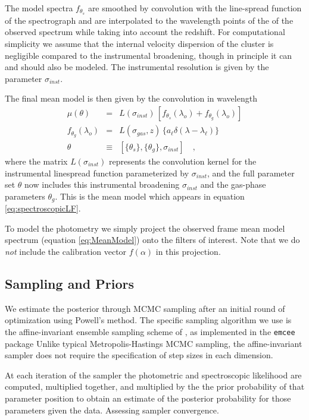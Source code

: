 \documentclass[iop,numberedappendix]{emulateapj}
\begin{document}
The model spectra $f_{\theta_s}$ are smoothed by convolution with
the line-spread function of the spectrograph and are interpolated to
the wavelength points of the of the observed spectrum while taking
into account the redshift. For computational simplicity we assume that
the internal velocity dispersion of the cluster is negligible compared
to the instrumental broadening, though in principle it can and should
also be modeled. The instrumental resolution is given by the parameter
$\sigma_{inst}$. 

The final mean model is then given by the convolution in wavelength
\begin{eqnarray}\label{eq:MeanModel} 
\mu(\theta) &  = & L(\sigma_{inst}) \, \left[ f_{\theta_s}(\lambda_o)
                   + f_{\theta_g}(\lambda_o) \right]\\
f_{\theta_g}(\lambda_o) & = & L(\sigma_{gas}, z) \,  \{a_\ell\delta(\lambda-\lambda_\ell)\}\\
\theta & \equiv & \left[ \{\theta_s\}, \{\theta_{g}\}, \sigma_{inst} \right]
\quad ,
\end{eqnarray}
where the matrix $L(\sigma_{inst})$ represents the convolution kernel
for the instrumental linespread function parameterized by
$\sigma_{inst}$,
and the full parameter set $\theta$ now includes
this instrumental broadening $\sigma_{inst}$ 
and the gas-phase parameters $\theta_g$.
This is the mean model which appears in equation
\ref{eq:spectroscopicLF}.

To model the photometry we simply project the observed frame mean
model spectrum (equation \ref{eq:MeanModel}) onto the filters of
interest.  Note that we do \emph{not} include the calibration vector
$f(\alpha)$ in this projection.


\subsection{Sampling and Priors}

We estimate the posterior through MCMC sampling after an initial round
of optimization using Powell's method.  The specific sampling
algorithm we use is the affine-invariant ensemble sampling scheme of
\citet{goodman}, as implemented in the \texttt{emcee} package
\citep{emcee} Unlike typical Metropolis-Hastings MCMC sampling, the
affine-invariant sampler does not require the specification of step
sizes in each dimension.
 
At each iteration of the sampler the photometric and spectroscopic
likelihood are computed, multiplied together, and multiplied by the
the prior probability of that parameter position to obtain an estimate
of the posterior probability for those parameters given the
data. {\color{blue}Assessing sampler convergence.}
\end{document}

